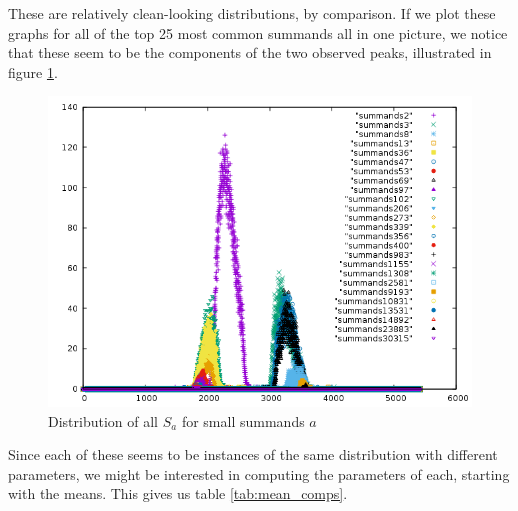 \documentclass{report}
\theoremstyle{remark}
\numberwithin{equation}{section}
\begin{document}
These are relatively clean-looking distributions, by comparison.  If
we plot these graphs for all of the top 25 most common summands all in
one picture, we notice that these seem to be the components of the two
observed peaks, illustrated in figure \ref{fig:summands}.

\begin{figure}
\caption{Distribution of all $S_a$ for small summands $a$}\label{fig:summands}
\centering
\includegraphics[scale=0.5]{../figs/summands_mod_5422.png}
\end{figure}

Since each of these seems to be instances of the same distribution
with different parameters, we might be interested in computing the
parameters of each, starting with the means.  This gives us table
\ref{tab:mean_comps}.

\end{document}
